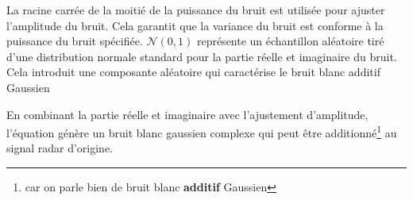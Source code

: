 La racine carrée de la moitié de la puissance du bruit est utilisée pour ajuster l'amplitude du bruit. Cela garantit que la variance du bruit est conforme à la puissance du bruit spécifiée.
\(\mathcal{N}(0, 1)\) représente un échantillon aléatoire tiré d'une distribution normale standard pour la partie réelle et imaginaire du bruit. Cela introduit une composante aléatoire qui caractérise le bruit blanc additif Gaussien

En combinant la partie réelle et imaginaire avec l'ajustement d'amplitude, l'équation génère un bruit blanc gaussien complexe qui peut être additionné\footnote{car on parle bien de bruit blanc \textbf{additif} Gaussien} au signal radar d'origine.\\